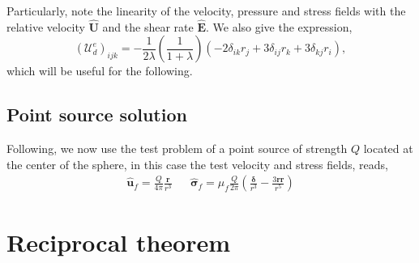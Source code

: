 Particularly, note the linearity of the velocity, pressure and stress fields with the relative velocity $\hat{\textbf{U}}$ and the shear rate $\hat{\textbf{E}}$. 
We also give the expression, 
\begin{equation*}
    (\mathcal{U}_d^e)_{ijk} 
    = 
    - \frac{1}{2\lambda}\left(\frac{1}{1+\lambda}\right)(-2 \delta_{ik} r_j + 3\delta_{ij} r_k + 3\delta_{kj} r_i) ,
\end{equation*}
which will be useful for the following. 

\subsection{Point source solution}
Following, \citet{stone2001inertial} we now use the test problem of a point source of strength $Q$ located at the center of the sphere, in this case the test velocity  and stress fields, reads, 
\begin{align}
    \hat{\textbf{u}}_f = \frac{Q}{4\pi} \frac{\textbf{r}}{r^3}
    && \hat{\bm\sigma}_f = \mu_f \frac{Q}{2\pi}\left(
        \frac{\bm\delta}{r^3}
        - \frac{3 \textbf{rr}}{r^5}
    \right)
    \label{eq:point_source}
\end{align}

\section{Reciprocal theorem} %

